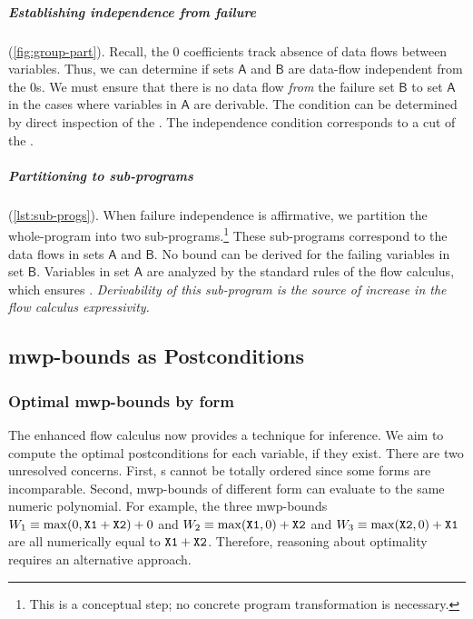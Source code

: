 \subparagraph*{Establishing independence from failure} (\autoref{fig:group-part}).
Recall, the \(0\) coefficients track
{absence} of data flows between variables. Thus, we can determine if sets
\(\mathsf{A}\) and \(\mathsf{B}\) are data-flow independent from the \(0\)s. We must ensure that there is no data flow
\emph{from} the failure set \(\mathsf{B}\) to set \(\mathsf{A}\) in the cases
where variables in \(\mathsf{A}\) are derivable. The condition can be determined
by direct inspection of the . The independence condition
corresponds to a cut of the .

\subparagraph*{Partitioning to sub-programs} (\autoref{lst:sub-progs}).
When failure independence is affirmative, we {partition} the whole-program into
two sub-programs.\footnote{This is a conceptual step; no concrete program
transformation is necessary.} These sub-programs correspond to the data flows in
sets \(\mathsf{A}\) and \(\mathsf{B}\). No bound can be derived for the failing
variables in set \(\mathsf{B}\). Variables in set \(\mathsf{A}\) are analyzed by
the standard rules of the flow calculus, which ensures
. \emph{Derivability of this sub-program is the source of
increase in the flow calculus expressivity.}

\subsection{mwp-bounds as Postconditions}
\label{sec:pc-analysis}

\subsubsection{Optimal mwp-bounds by form}
\label{subsec:categories}

The enhanced flow calculus now provides a technique for
 inference. We aim to compute the optimal postconditions for
each variable, if they exist. There are two unresolved concerns. First,
s cannot be totally ordered since some forms are incomparable.
Second, mwp-bounds of different form can evaluate to the same numeric
polynomial. For example, the three mwp-bounds \(W_1 \equiv
\max(0,\prm{X1}+\prm{X2})+0\) and \(W_2 \equiv
\max(\prm{X1},0)+\prm{X2}\) and \(W_3 \equiv \max(\prm{X2},0)+\prm{X1}\) are all
numerically equal to \(\prm{X1}+\prm{X2}\). Therefore, reasoning about
optimality requires an alternative approach.

